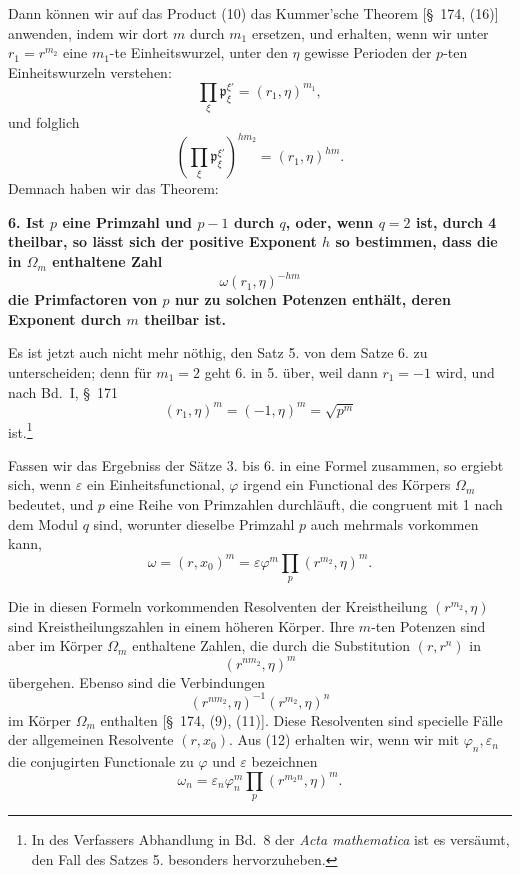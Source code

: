 \documentclass[11pt]{article}
\newcommand{\pp}{\mathfrak p}
\newcommand{\eps}{\varepsilon}
\begin{document}
Dann können wir auf das Product (10) das Kummer'sche Theorem [\S~174, (16)] anwenden, indem wir dort $m$ durch $m_1$ ersetzen, und erhalten, wenn wir unter $r_1=r^{m_2}$ eine $m_1$-te Einheitswurzel, unter den $\eta$ gewisse Perioden der $p$-ten Einheitswurzeln verstehen:
\[
  \prod_\xi\pp_\xi^{\xi'}=(r_1,\eta)^{m_1},
\]
und folglich
\begin{equation}
  \left(\prod_\xi\pp_\xi^{\xi'}\right)^{hm_2}=(r_1,\eta)^{hm}.
\tag{11}
\end{equation}
Demnach haben wir das Theorem:

\textbf{6. Ist $p$ eine Primzahl und $p-1$ durch $q$, oder, wenn $q=2$ ist, durch 4 theilbar, so lässt sich der positive Exponent $h$ so bestimmen, dass die in $\Omega_m$ enthaltene Zahl}
\[
  \omega(r_1,\eta)^{-hm}
\]
\textbf{die Primfactoren von $p$ nur zu solchen Potenzen enthält, deren Exponent durch $m$ theilbar ist.}

Es ist jetzt auch nicht mehr nöthig, den Satz 5. von dem Satze 6. zu unterscheiden; denn für $m_1=2$ geht 6. in 5. über, weil dann $r_1=-1$ wird, und nach Bd.~I, \S~171
\[
  (r_1,\eta)^m=(-1,\eta)^m=\sqrt{p^m}
\]
ist.\footnote{In des Verfassers Abhandlung in Bd.~8 der \textit{Acta mathematica} ist es versäumt, den Fall des Satzes 5. besonders hervorzuheben.}

Fassen wir das Ergebniss der Sätze 3. bis 6. in eine Formel zusammen, so ergiebt sich, wenn $\eps$ ein Einheitsfunctional, $\varphi$ irgend ein Functional des Körpers $\Omega_m$ bedeutet, und $p$ eine Reihe von Primzahlen durchläuft, die congruent mit 1 nach dem Modul $q$ sind, worunter dieselbe Primzahl $p$ auch mehrmals vorkommen kann,
\begin{equation}
  \omega=(r,x_0)^m=\eps\varphi^m\prod_p(r^{m_2},\eta)^m.
\tag{12}
\end{equation}

Die in diesen Formeln vorkommenden Resolventen der Kreistheilung $(r^{m_2},\eta)$ sind Kreistheilungszahlen in einem höheren Körper. Ihre $m$-ten Potenzen sind aber im Körper $\Omega_m$ enthaltene Zahlen, die durch die Substitution $(r,r^n)$ in
\[
  (r^{nm_2},\eta)^m
\]
übergehen. Ebenso sind die Verbindungen
\begin{equation}
  (r^{nm_2},\eta)^{-1}(r^{m_2},\eta)^n
\tag{13}
\end{equation}
im Körper $\Omega_m$ enthalten [\S~174, (9), (11)]. Diese Resolventen sind specielle Fälle der allgemeinen Resolvente $(r,x_0)$. Aus (12) erhalten wir, wenn wir mit $\varphi_n,\eps_n$ die conjugirten Functionale zu $\varphi$ und $\eps$ bezeichnen
\begin{equation}
  \omega_n=\eps_n\varphi_n^m\prod_p(r^{m_2 n},\eta)^m.
\tag{14}
\end{equation}
\end{document}
